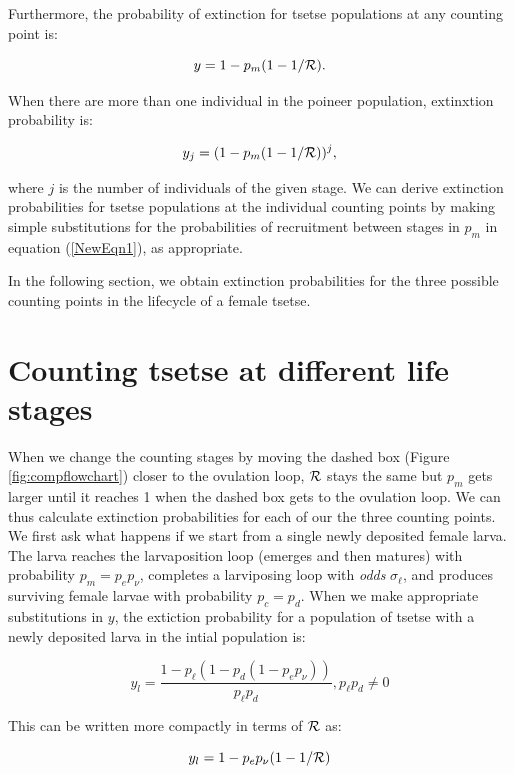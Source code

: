 \documentclass[smallextended]{svjour3}
\newcommand{\comment}[3]{\textcolor{#1}{\textbf{[#2: }\textit{#3}\textbf{]}}}
\newcommand{\jd}[1]{\comment{cyan}{JD}{#1}}
\begin{document}
Furthermore, the probability of extinction for tsetse populations at any counting point is:

\begin{equation}
	\label{NewEqn1}	
	y = 1 - p_m(1-1/{\cal R}).	
\end{equation}

When there are more than one individual in the poineer population, extinxtion probability is:

$$y_j = (1 - p_m(1-1/{\cal R}))^j,$$

where $j$ is the number of individuals of the given stage. We can derive extinction probabilities for tsetse populations at the individual counting points by making simple substitutions for the probabilities of recruitment  between stages in $p_m$  in equation (\ref{NewEqn1}), as appropriate. 

In the following section, we obtain extinction probabilities  for the three possible counting points in the lifecycle of a female tsetse.

\section{Counting tsetse at different life stages}

When we change the counting stages by moving the dashed box (Figure \ref{fig:compflowchart}) closer to the ovulation loop, ${\cal R}$ stays the same but $p_m$ gets larger until it reaches 1 when the dashed box gets to the ovulation loop. We can thus calculate extinction probabilities for each of our the three counting points. We first ask what happens if we start from a single newly deposited female larva.
The larva reaches the larvaposition loop (emerges and then matures) with probability $p_m = p_e p_{\nu}$, completes a larviposing loop with \textit{odds} $\sigma_\ell$, and produces surviving female larvae with probability $p_c = p_d$. 
When we make appropriate substitutions in $y$, the extiction probability for a population of tsetse with a newly deposited larva in the intial population is:

$$y_l = \frac{1-p_{\ell}(1 - p_{d}(1 - p_{e}p_{\nu}))}{p_{\ell}p_{d}}, p_{\ell}p_{d} \neq 0$$


This can be written more compactly in terms of ${\cal R}$ as:

\begin{equation}
	\label{NewEqn2}
	y_l = 1 - p_ep_{\nu}(1-1/{\cal R})	
\end{equation}
\end{document}
